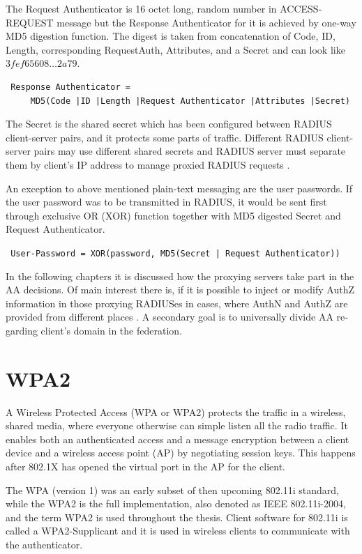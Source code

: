 \documentclass[12pt,a4paper,english]{tutthesis}
\begin{document}
\begin{otherlanguage}{english}
The Request Authenticator is 16 octet long, random number in
ACCESS-REQUEST message but the Response Authenticator for it is achieved
by one-way MD5 digestion function. 
The digest is taken from concatenation of Code, ID, Length, corresponding
Request\-Auth, Attributes, and a Secret and can look like 
$3fef65608\ldots 2a79$. 
\begin{verbatim}
 Response Authenticator = 
     MD5(Code |ID |Length |Request Authenticator |Attributes |Secret)
\end{verbatim}
The Secret is the shared secret which has been configured between
RADIUS client-server pairs,
and it protects some parts of traffic. 
Different RADIUS client-server pairs may use different
shared secrets and RADIUS server must separate them by client's IP address to
manage proxied RADIUS requests \cite{radiusbook}.

An exception to above mentioned plain-text messaging are the user passwords.
If the user password was to be transmitted in RADIUS, it would be sent first
through exclusive OR (XOR) function together with MD5 digested Secret
and Request Authenticator.
\begin{center}
{\tt 
User-Password = XOR(password, MD5(Secret | Request Authenticator))}
\end{center}




In the following chapters it is discussed how the proxying servers take 
part in the AA decisions. Of main interest there is, if it is possible 
to inject or modify AuthZ information in those proxying RADIUSes in
cases, where AuthN and AuthZ are provided from different
 places \cite{rfc2607}. A secondary goal is to universally divide AA regarding 
client's domain in the federation.




\section{WPA2}
\label{sec-2-3}

A Wireless Protected Access (WPA or WPA2) protects the traffic in a wireless,
shared media, where everyone otherwise can simple listen all the radio traffic.
It enables both an authenticated access and a message
encryption between a client device and  a wireless access point (AP)
by negotiating session keys. This happens 
after 802.1X has opened the virtual port in the AP for the client.

The WPA (version 1)  was an early subset of then upcoming 802.11i standard,
while the WPA2 is the full implementation, also denoted as IEEE
802.11i-2004, and the term WPA2 is used throughout the thesis.
Client software for 802.11i is called a WPA2-Supplicant and it is used
in wireless clients to communicate with the authenticator. 


\end{otherlanguage}
\end{document}
